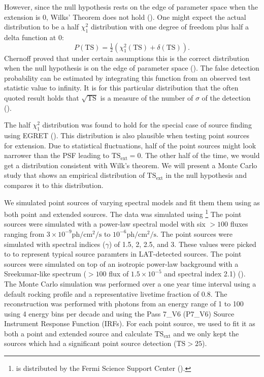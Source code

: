 \documentclass[12pt,preprint]{aastex}
\newcommand{\mev}{\text{MeV}\xspace}
\newcommand{\gev}{\text{GeV}\xspace}
\newcommand{\ph}{\text{ph}\xspace}
\newcommand{\cm}{\text{cm}\xspace}
\renewcommand{\sec}{\text{s}\xspace}
\newcommand{\tsext}{{\ensuremath{\text{TS}_\text{ext}}}\xspace}
\newcommand{\ts}{\text{TS}\xspace}
\newcommand{\pointlike}{\text{\em pointlike}\xspace}
\newcommand{\gtobssim}{\text{\em gtobssim}\xspace}
\begin{document}
However, since the null hypothesis rests on the edge of
parameter space when the extension is 0, Wilks' Theorem does not hold
(\cite{warn_wilks_theorem}).  One might expect the actual distribution
to be a half $\chi^2_1$ distribution with one degree of freedom plus
half a delta function at 0:
\begin{equation}
  P(\ts)=\tfrac{1}{2}(\chi^2_1(\ts)+\delta(\ts)).
\end{equation}
Chernoff proved that under certain assumptions this is the correct distribution
when the null hypothesis is on the edge of parameter
space (\cite{chernoff}).  The false detection
probability can be estimated by integrating this function from an observed
test statistic value to infinity. It is for this particular distribution
that the often quoted result holds that $\sqrt{\ts}$ is a measure of
the number of $\sigma$ of the detection (\cite{mattox_egret}).

The half $\chi^2_1$ distribution was found to hold for the special case
of source finding using EGRET (\cite{mattox_egret}). This distribution
is also plausible when testing point sources for extension. Due to
statistical fluctuations, half of the point sources might look narrower
than the PSF leading to $\tsext=0$. The other half of the time, we would
get a distribution consistent with Wilk's theorem. We will present a
Monte Carlo study that shows an empirical distribution of \tsext in the
null hypothesis and compares it to this distribution.

We simulated point sources of varying spectral models and fit them
them using \pointlike as both point and extended sources. The data was
simulated using \gtobssim\footnote{\gtobssim is distributed
by the Fermi Science Support Center (\cite{fssc}).}
The point sources were simulated with a power-law spectral model with
six $>100$ \mev fluxes ranging from $3\times 10^{-9} \ph/\cm^2/\sec$ to
$10^{-6} \ph/\cm^2/\sec$.  The point sources were simulated with spectral
indices ($\gamma$) of 1.5, 2, 2.5, and 3.  These values were picked to
to represent typical source paramters in LAT-detected sources. The point
sources were simulated on top of an isotropic power-law background
with a Sreekumar-like spectrum ($>100$ \mev flux of $1.5\times 10^{-5}$ and spectral
index 2.1) (\cite{sreekumar_isotropic}).  The Monte Carlo simulation was
performed over a one year time interval using a default rocking profile
and a representative livetime fraction of 0.8.  The reconstruction was
performed with photons from an energy range of 1 \gev to 100 \gev using 4
energy bins per decade and using the 
Pass 7\_V6 (P7\_V6) Source Instrument
Response Function (IRFs).  For each point source, we used \pointlike
to fit it as both a point and extended source and calculate \tsext and
we only kept the sources which had a significant point source detection
($\ts>25$).
\end{document}
